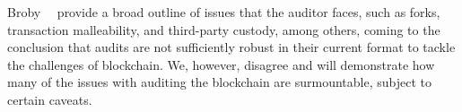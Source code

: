 Broby~\etal~\cite{broby2017financial} provide a broad outline of issues that the auditor faces, such as forks, transaction malleability, and third-party custody, among others, coming to the conclusion that audits are not sufficiently robust in their current format to tackle the challenges of blockchain. We, however, disagree and will demonstrate how many of the issues with auditing the blockchain are surmountable, subject to certain caveats.





